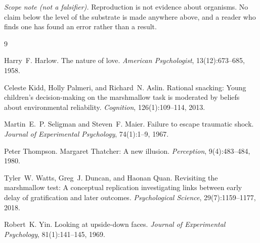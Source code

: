 \documentclass[11pt,a4paper]{article}
\theoremstyle{remark}
\begin{document}
\noindent\emph{Scope note (not a falsifier).} Reproduction is not evidence about organisms. No claim
below the level of the substrate is made anywhere above, and a reader who finds one has found an
error rather than a result.

\begin{thebibliography}{9}

Harry~F. Harlow.
\newblock The nature of love.
\newblock \emph{American Psychologist}, 13(12):673--685, 1958.

Celeste Kidd, Holly Palmeri, and Richard~N. Aslin.
\newblock Rational snacking: Young children's decision-making on the marshmallow task is moderated
by beliefs about environmental reliability.
\newblock \emph{Cognition}, 126(1):109--114, 2013.

Martin~E.~P. Seligman and Steven~F. Maier.
\newblock Failure to escape traumatic shock.
\newblock \emph{Journal of Experimental Psychology}, 74(1):1--9, 1967.

Peter Thompson.
\newblock Margaret Thatcher: A new illusion.
\newblock \emph{Perception}, 9(4):483--484, 1980.

Tyler~W. Watts, Greg~J. Duncan, and Haonan Quan.
\newblock Revisiting the marshmallow test: A conceptual replication investigating links between
early delay of gratification and later outcomes.
\newblock \emph{Psychological Science}, 29(7):1159--1177, 2018.

Robert~K. Yin.
\newblock Looking at upside-down faces.
\newblock \emph{Journal of Experimental Psychology}, 81(1):141--145, 1969.

\end{thebibliography}
\end{document}
